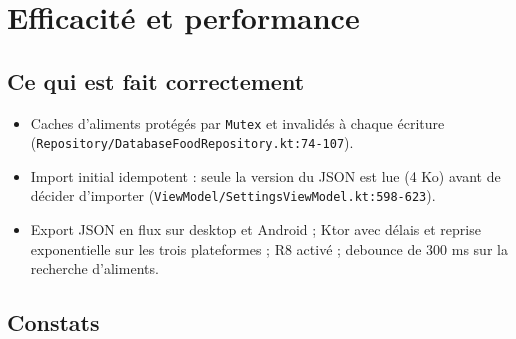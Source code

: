\documentclass[11pt,a4paper]{article}
\newcommand{\fichier}[1]{\texttt{\small #1}}
\newcommand{\code}[1]{\texttt{#1}}
\begin{document}
\section{Efficacité et performance}\label{sec:performance}

\subsection*{Ce qui est fait correctement}

\begin{itemize}
\item Caches d'aliments protégés par \code{Mutex} et invalidés à chaque écriture
  (\fichier{Repository/DatabaseFoodRepository.kt:74-107}).
\item Import initial idempotent : seule la version du JSON est lue (4 Ko) avant de décider
  d'importer (\fichier{ViewModel/SettingsViewModel.kt:598-623}).
\item Export JSON en flux sur desktop et Android ; Ktor avec délais et reprise exponentielle sur
  les trois plateformes ; R8 activé ; debounce de 300 ms sur la recherche d'aliments.
\end{itemize}

\subsection*{Constats}
\end{document}
